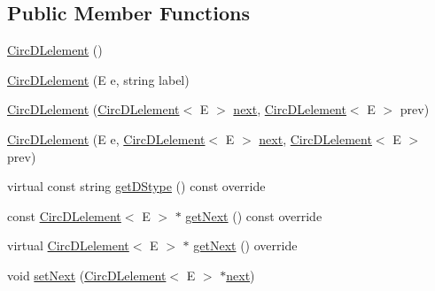 \subsection*{Public Member Functions}
\begin{DoxyCompactItemize}
\item 
\hyperlink{classbridges_1_1datastructure_1_1_circ_d_lelement_acd151aff05440f2c6fe26f41b46e0668}{Circ\+D\+Lelement} ()
\item 
\hyperlink{classbridges_1_1datastructure_1_1_circ_d_lelement_a88232de87ec750fccd655d6591870f4c}{Circ\+D\+Lelement} (E e, string label)
\item 
\hyperlink{classbridges_1_1datastructure_1_1_circ_d_lelement_a8db4aa80feb388d5206d657d80385f16}{Circ\+D\+Lelement} (\hyperlink{classbridges_1_1datastructure_1_1_circ_d_lelement}{Circ\+D\+Lelement}$<$ E $>$ \hyperlink{classbridges_1_1datastructure_1_1_s_lelement_afc016a593a4a5aba82021ee34edadbfc}{next}, \hyperlink{classbridges_1_1datastructure_1_1_circ_d_lelement}{Circ\+D\+Lelement}$<$ E $>$ prev)
\item 
\hyperlink{classbridges_1_1datastructure_1_1_circ_d_lelement_a52b304df48ac1ba5a13b4c3c596f433b}{Circ\+D\+Lelement} (E e, \hyperlink{classbridges_1_1datastructure_1_1_circ_d_lelement}{Circ\+D\+Lelement}$<$ E $>$ \hyperlink{classbridges_1_1datastructure_1_1_s_lelement_afc016a593a4a5aba82021ee34edadbfc}{next}, \hyperlink{classbridges_1_1datastructure_1_1_circ_d_lelement}{Circ\+D\+Lelement}$<$ E $>$ prev)
\item 
virtual const string \hyperlink{classbridges_1_1datastructure_1_1_circ_d_lelement_aec7f9b9dc6626c1a872feb91cd65425d}{get\+D\+Stype} () const override
\item 
const \hyperlink{classbridges_1_1datastructure_1_1_circ_d_lelement}{Circ\+D\+Lelement}$<$ E $>$ $\ast$ \hyperlink{classbridges_1_1datastructure_1_1_circ_d_lelement_a3b54f07ffa49151ed13d8b8df964a4ee}{get\+Next} () const override
\item 
virtual \hyperlink{classbridges_1_1datastructure_1_1_circ_d_lelement}{Circ\+D\+Lelement}$<$ E $>$ $\ast$ \hyperlink{classbridges_1_1datastructure_1_1_circ_d_lelement_a80681d0382643a6df21da1bec4067004}{get\+Next} () override
\item 
void \hyperlink{classbridges_1_1datastructure_1_1_circ_d_lelement_aa19f430c7b00a6d38187021255f741e4}{set\+Next} (\hyperlink{classbridges_1_1datastructure_1_1_circ_d_lelement}{Circ\+D\+Lelement}$<$ E $>$ $\ast$\hyperlink{classbridges_1_1datastructure_1_1_s_lelement_afc016a593a4a5aba82021ee34edadbfc}{next})

\end{DoxyCompactItemize}
